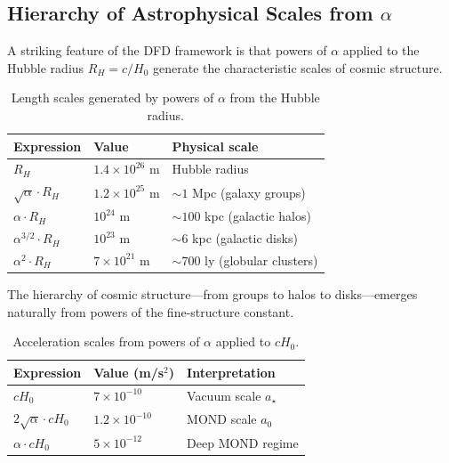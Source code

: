 \subsection{Hierarchy of Astrophysical Scales from $\alpha$}\label{sec:cosmo-hierarchy}

A striking feature of the DFD framework is that powers of $\alpha$ applied to 
the Hubble radius $R_H = c/H_0$ generate the characteristic scales of cosmic structure.

\begin{table}[h]
\centering
\caption{Length scales generated by powers of $\alpha$ from the Hubble radius.}\label{tab:length-hierarchy}
\begin{tabular}{@{}lll@{}}
\toprule
Expression & Value & Physical scale \\
\midrule
$R_H$ & $1.4 \times 10^{26}$ m & Hubble radius \\
$\sqrt{\alpha} \cdot R_H$ & $1.2 \times 10^{25}$ m & $\sim 1$ Mpc (galaxy groups) \\
$\alpha \cdot R_H$ & $10^{24}$ m & $\sim 100$ kpc (galactic halos) \\
$\alpha^{3/2} \cdot R_H$ & $10^{23}$ m & $\sim 6$ kpc (galactic disks) \\
$\alpha^2 \cdot R_H$ & $7 \times 10^{21}$ m & $\sim 700$ ly (globular clusters) \\
\bottomrule
\end{tabular}
\end{table}

The hierarchy of cosmic structure---from groups to halos to disks---emerges 
naturally from powers of the fine-structure constant.

\begin{table}[h]
\centering
\caption{Acceleration scales from powers of $\alpha$ applied to $cH_0$.}\label{tab:accel-hierarchy}
\begin{tabular}{@{}lll@{}}
\toprule
Expression & Value (m/s$^2$) & Interpretation \\
\midrule
$cH_0$ & $7 \times 10^{-10}$ & Vacuum scale $a_\star$ \\
$2\sqrt{\alpha} \cdot cH_0$ & $1.2 \times 10^{-10}$ & MOND scale $a_0$ \\
$\alpha \cdot cH_0$ & $5 \times 10^{-12}$ & Deep MOND regime \\
\bottomrule
\end{tabular}
\end{table}

